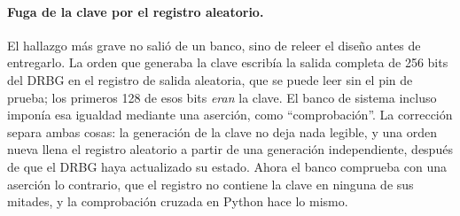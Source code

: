 \paragraph{Fuga de la clave por el registro aleatorio.} El hallazgo más
grave no salió de un banco, sino de releer el diseño antes de
entregarlo. La orden que generaba la clave escribía la salida completa
de 256 bits del DRBG en el registro de salida aleatoria, que se puede
leer sin el pin de prueba; los primeros 128 de esos bits \emph{eran} la
clave. El banco de sistema incluso imponía esa igualdad mediante una
aserción, como ``comprobación''. La corrección separa ambas cosas: la
generación de la clave no deja nada legible, y una orden nueva llena el
registro aleatorio a partir de una generación independiente, después de
que el DRBG haya actualizado su estado. Ahora el banco comprueba con una
aserción lo contrario, que el registro no contiene la clave en ninguna
de sus mitades, y la comprobación cruzada en Python hace lo mismo.

